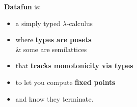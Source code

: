 \documentclass{beamer}
\newcommand{\m}[1]{\ensuremath{\mathbf{#1}}}
\newcommand{\ms}{\mathsf}
\begin{document}

\begin{frame}

  \Large \textbf{Datafun} is:
  \begin{itemize}
  \item a simply typed $\lambda$-calculus
  \item where \textbf{types are posets}\\{\& some are semilattices}
  \item that \textbf{tracks monotonicity via types}
  \item to let you compute \textbf{fixed points}
  \item and know they terminate.
  \end{itemize}
\end{frame}







\end{document}
